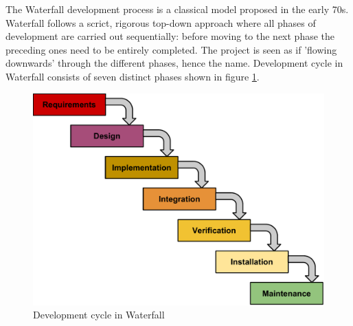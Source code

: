 The Waterfall development process is a classical model proposed in the early 70s.
Waterfall follows a scrict, rigorous top-down approach where all phases of development are
carried out sequentially: before moving to the next phase the preceding ones
need to be entirely completed. The project is seen as if 'flowing downwards'
through the different phases, hence the name. Development cycle in Waterfall consists of seven
distinct phases shown in figure \ref{figure:waterfall-model}.

\begin{figure}[h]
\begin{center}
\includegraphics[scale=0.6]{../Figures/Waterfall-model.pdf}
\end{center}
\caption{Development cycle in Waterfall}
\label{figure:waterfall-model}
\end{figure}

